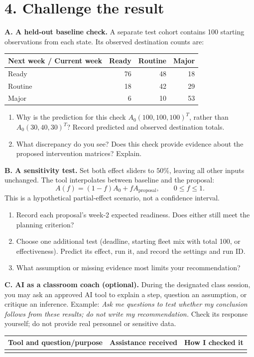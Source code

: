\documentclass[10pt,letterpaper]{article}
\newcommand{\spacefor}[1]{\vspace{#1}}
\begin{document}
\section*{4. Challenge the result}
\textbf{A. A held-out baseline check.} A separate test cohort contains 100 starting observations from each state. Its observed destination counts are:
\begin{center}
\begin{tabular}{lrrr}
\toprule
Next week / Current week & Ready & Routine & Major\\
\midrule
Ready &76&48&18\\
Routine &18&42&29\\
Major &6&10&53\\
\bottomrule
\end{tabular}
\end{center}
\begin{enumerate}[label=(\alph*),nosep]
\item Why is the prediction for this check $A_0(100,100,100)^T$, rather than $A_0(30,40,30)^T$? Record predicted and observed destination totals.
\spacefor{0.5in}
\item What discrepancy do you see? Does this check provide evidence about the proposed intervention matrices? Explain.
\spacefor{0.4in}
\end{enumerate}
\textbf{B. A sensitivity test.} Set both effect sliders to $50\%$, leaving all other inputs unchanged. The tool interpolates between baseline and the proposal:
\[
A(f)=(1-f)A_0+fA_{\mathrm{proposal}},\qquad 0\le f\le1.
\]
This is a hypothetical partial-effect scenario, not a confidence interval.
\begin{enumerate}[label=(\alph*),resume,nosep]
\item Record each proposal's week-2 expected readiness. Does either still meet the planning criterion?
\spacefor{0.35in}
\item Choose one additional test (deadline, starting fleet mix with total 100, or effectiveness). Predict its effect, run it, and record the settings and run ID.
\spacefor{0.45in}
\item What assumption or missing evidence most limits your recommendation?
\spacefor{0.35in}
\end{enumerate}
\textbf{C. AI as a classroom coach (optional).} During the designated class session, you may ask an approved AI tool to explain a step, question an assumption, or critique an inference. Example: \emph{Ask me questions to test whether my conclusion follows from these results; do not write my recommendation.} Check its response yourself; do not provide real personnel or sensitive data.
\begin{center}
\begin{tabularx}{\textwidth}{YYY}
\toprule
Tool and question/purpose & Assistance received & How I checked it\\
\midrule
&&\\[0.35in]
\bottomrule
\end{tabularx}
\end{center}
\end{document}
